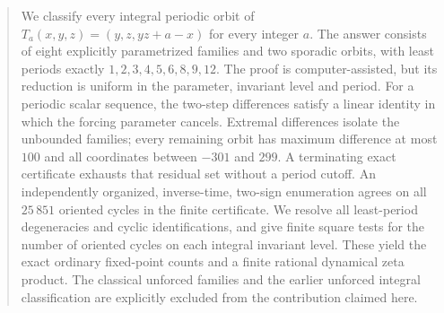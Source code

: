 \begin{abstract}
We classify every integral periodic orbit of
$T_a(x,y,z)=(y,z,yz+a-x)$ for every integer $a$. The answer consists
of eight explicitly parametrized families and two sporadic orbits,
with least periods exactly $1,2,3,4,5,6,8,9,12$. The proof is
computer-assisted, but its reduction is uniform in the parameter,
invariant level and period. For a periodic scalar sequence, the
two-step differences satisfy a linear identity in which the forcing
parameter cancels. Extremal differences isolate the unbounded
families; every remaining orbit has maximum difference at most $100$
and all coordinates between $-301$ and $299$. A terminating exact
certificate exhausts that residual set without a period cutoff.
An independently organized, inverse-time, two-sign enumeration agrees
on all $25\,851$ oriented cycles in the finite certificate.
We resolve all least-period degeneracies and cyclic identifications,
and give finite square tests for the number of oriented cycles on
each integral invariant level. These yield the exact ordinary
fixed-point counts and a finite rational dynamical zeta product.
The classical unforced families and the earlier unforced integral
classification are explicitly excluded from the contribution claimed
here.
\end{abstract}
